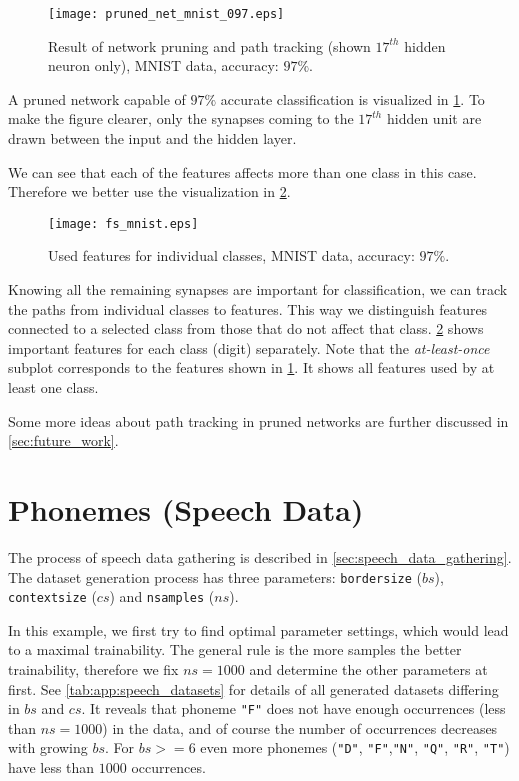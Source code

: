 \begin{figure}[H]
\centering
\texttt{[image: pruned\_net\_mnist\_097.eps]}
\caption{Result of network pruning and path tracking (shown $ 17^{th} $ hidden neuron only), MNIST data, accuracy: $ 97\% $.}
\label{fig:examples:pruned_net_mnist_097}
\end{figure}

A pruned network capable of $ 97\% $ accurate classification is visualized in \cref{fig:examples:pruned_net_mnist_097}. To make the figure clearer, only the synapses coming to the $ 17^{th} $ hidden unit are drawn between the input and the hidden layer.

We can see that each of the features affects more than one class in this case. Therefore we better use the visualization in \cref{fig:examples:fs_mnist}. 

\begin{figure}[H]
\centering
\texttt{[image: fs\_mnist.eps]}
\caption{Used features for individual classes, MNIST data, accuracy: $ 97\% $.}
\label{fig:examples:fs_mnist}
\end{figure}

Knowing all the remaining synapses are important for classification, we can track the paths from individual classes to features. This way we distinguish features connected to a selected class from those that do not affect that class. \cref{fig:examples:fs_mnist} shows important features for each class (digit) separately. Note that the \textit{at-least-once} subplot corresponds to the features shown in \cref{fig:examples:pruned_net_mnist_097}. It shows all features used by at least one class.

Some more ideas about path tracking in pruned networks are further discussed in \cref{sec:future_work}.

\section{Phonemes (Speech Data)} \label{sec:example_speech}
The process of speech data gathering is described in \cref{sec:speech_data_gathering}. The dataset generation process has three parameters: \texttt{border\textunderscore size} ($ bs $), \texttt{context\textunderscore size} ($ cs $) and \texttt{n\textunderscore samples} ($ ns $).

In this example, we first try to find optimal parameter settings, which would lead to a maximal trainability. The general rule is the more samples the better trainability, therefore we fix $ ns = 1000 $ and determine the other parameters at first. See \cref{tab:app:speech_datasets} for details of all generated datasets differing in $ bs $ and $ cs $. It reveals that phoneme \texttt{"F"} does not have enough occurrences (less than $ ns = 1000 $) in the data, and of course the number of occurrences decreases with growing $ bs $. For $ bs >= 6 $ even more phonemes (\texttt{"D"}, \texttt{"F"},\texttt{"N"}, \texttt{"Q"}, \texttt{"R"}, \texttt{"T"}) have less than $ 1000 $ occurrences.

